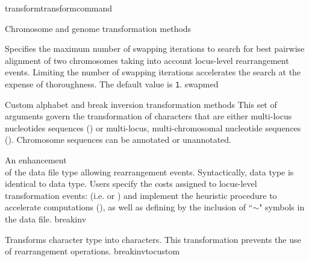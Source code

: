 \begin{command}{transform}{transformcommand}
\begin{arguments}
\begin{argumentgroup}{Chromosome and genome transformation methods}
\begin{description}
                    {Specifies the maximum number of swapping iterations
                    to search for best pairwise alignment of two chromosomes
                    taking into account locus-level rearrangement events. 
                    Limiting the number of swapping
                    iterations accelerates the search at the expense of
                    thoroughness. The default value is \texttt{1}.}
                    {swapmed}

            \end{description}
        \end{argumentgroup}




        \begin{argumentgroup}
            {Custom alphabet and break inversion transformation methods}   
            This set of arguments govern the transformation of characters that are either multi-locus nucleotides 
            sequences () or multi-locus, multi-chromosomal nucleotide
            sequences ().  Chromosome sequences can be \poyargument
            {annotated} or unannotated.

                {An enhancement \\ of the data file type  allowing
                rearrangement events. Syntactically,  data type is identical to 
                 data type. Users specify 
                the costs assigned to locus-level transformation events: (i.e. 
                 or  ) 
                and implement the heuristic  procedure to accelerate computations 
                (), as well as defining  by the 
                inclusion of ``$\sim$" symbols in the data file.} 
                {breakinv}
            
                {Transforms  character type into  characters.
                This transformation prevents the use of rearrangement operations.}
                {breakinvtocustom}


\end{argumentgroup}
\end{arguments}
\end{command}
